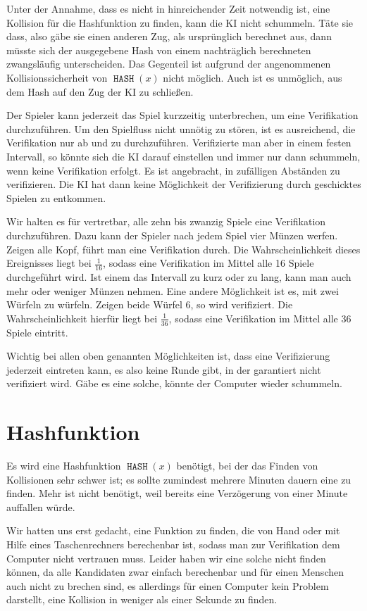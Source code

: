 \documentclass{scrartcl}
\newcommand{\dice}[1]{#1}
\DeclareMathOperator{\hash}{\texttt{HASH}}
\begin{document}
Unter der Annahme, dass es nicht in hinreichender Zeit notwendig ist, eine
Kollision für die Hashfunktion zu finden, kann die KI nicht schummeln.  Täte sie
dass, also gäbe sie einen anderen Zug, als ursprünglich berechnet aus, dann
müsste sich der ausgegebene Hash von einem nachträglich berechneten zwangsläufig
unterscheiden. Das Gegenteil ist aufgrund der angenommenen Kollisionssicherheit
von $\hash(x)$ nicht möglich.  Auch ist es unmöglich, aus dem Hash auf den Zug
der KI zu schließen.

Der Spieler kann jederzeit das Spiel kurzzeitig unterbrechen, um eine
Verifikation durchzuführen. Um den Spielfluss nicht unnötig zu stören, ist es
ausreichend, die Verifikation nur ab und zu durchzuführen.  Verifizierte man
aber in einem festen Intervall, so könnte sich die KI darauf einstellen und
immer nur dann schummeln, wenn keine Verifikation erfolgt. Es ist angebracht,
in zufälligen Abständen zu verifizieren. Die KI hat dann keine Möglichkeit der
Verifizierung durch geschicktes Spielen zu entkommen.

Wir halten es für vertretbar, alle zehn bis zwanzig Spiele eine Verifikation
durchzuführen. Dazu kann der Spieler nach jedem Spiel vier Münzen werfen. Zeigen
alle Kopf, führt man eine Verifikation durch. Die Wahrscheinlichkeit dieses
Ereignisses liegt bei $\frac1{16}$, sodass eine Verifikation im Mittel alle 16
Spiele durchgeführt wird. Ist einem das Intervall zu kurz oder zu lang, kann man
auch mehr oder weniger Münzen nehmen. Eine andere Möglichkeit ist es, mit zwei
Würfeln zu würfeln. Zeigen beide Würfel \dice{6}, so wird verifiziert.  Die
Wahrscheinlichkeit hierfür liegt bei $\frac1{36}$, sodass eine Verifikation im
Mittel alle 36 Spiele eintritt.

Wichtig bei allen oben genannten Möglichkeiten ist, dass eine Verifizierung
jederzeit eintreten kann, es also keine Runde gibt, in der garantiert nicht
verifiziert wird. Gäbe es eine solche, könnte der Computer wieder schummeln.

\section{Hashfunktion}
Es wird eine Hashfunktion $\hash(x)$ benötigt, bei der das Finden von
Kollisionen sehr schwer ist; es sollte zumindest mehrere Minuten dauern eine zu
finden. Mehr ist nicht benötigt, weil bereits eine Verzögerung von einer Minute
auffallen würde.

Wir hatten uns erst gedacht, eine Funktion zu finden, die von Hand oder mit
Hilfe eines Taschenrechners berechenbar ist, sodass man zur Verifikation dem
Computer nicht vertrauen muss. Leider haben wir eine solche nicht finden können,
da alle Kandidaten zwar einfach berechenbar und für einen Menschen auch nicht zu
brechen sind, es allerdings für einen Computer kein Problem darstellt, eine
Kollision in weniger als einer Sekunde zu finden.
\end{document}
